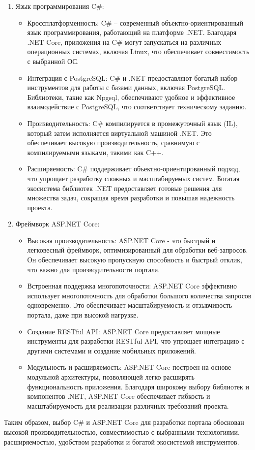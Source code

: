 \begin{enumerate}
	\item Язык программирования C\#:
	\begin{itemize}
		\item Кроссплатформенность: C\# -- современный объектно-ориентированный язык программирования, работающий на платформе .NET. Благодаря .NET Core, приложения на C\# могут запускаться на различных операционных системах, включая Linux, что обеспечивает совместимость с выбранной ОС.
		
		\item Интеграция с PostgreSQL: C\# и .NET предоставляют богатый набор инструментов для работы с базами данных, включая PostgreSQL. Библиотеки, такие как Npgsql, обеспечивают удобное и эффективное взаимодействие с PostgreSQL, что соответствует техническому заданию.
		
		\item Производительность: C\# компилируется в промежуточный язык (IL), который затем исполняется виртуальной машиной .NET. Это обеспечивает высокую производительность, сравнимую с компилируемыми языками, такими как C++.
		
		\item Расширяемость: C\# поддерживает объектно-ориентированный подход, что упрощает разработку сложных и масштабируемых систем. Богатая экосистема библиотек .NET предоставляет готовые решения для множества задач, сокращая время разработки и повышая надежность проекта.
	\end{itemize}
	\item Фреймворк ASP.NET Core:
	\begin{itemize}
		\item Высокая производительность: ASP.NET Core - это быстрый и легковесный фреймворк, оптимизированный для обработки веб-запросов. Он обеспечивает высокую пропускную способность и быстрый отклик, что важно для производительности портала.
		
		\item Встроенная поддержка многопоточности: ASP.NET Core эффективно использует многопоточность для обработки большого количества запросов одновременно. Это обеспечивает масштабируемость и отзывчивость портала, даже при высокой нагрузке.
		
		\item Создание RESTful API: ASP.NET Core предоставляет мощные инструменты для разработки RESTful API, что упрощает интеграцию с другими системами и создание мобильных приложений.
		
		\item Модульность и расширяемость: ASP.NET Core построен на основе модульной архитектуры, позволяющей легко расширять функциональность приложения. Благодаря широкому выбору библиотек и компонентов .NET, ASP.NET Core обеспечивает гибкость и масштабируемость для реализации различных требований проекта.
	\end{itemize}
\end{enumerate}

Таким образом, выбор C\# и ASP.NET Core для разработки портала обоснован высокой производительностью, совместимостью с выбранными технологиями, расширяемостью, удобством разработки и богатой экосистемой инструментов.